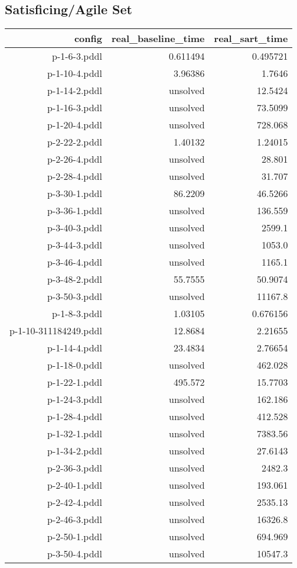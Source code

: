 \documentclass{article}
\begin{document}
                    \subsection*{Satisficing/Agile Set}
                    
                            \begin{center}
                            \scriptsize
                            \begin{tabular}{r|r|r}
                            config & real\_baseline\_time & real\_sart\_time\\\midrule
                             p-1-6-3.pddl&0.611494&0.495721\\
 p-1-10-4.pddl&3.96386&1.7646\\
 p-1-14-2.pddl&unsolved&12.5424\\
 p-1-16-3.pddl&unsolved&73.5099\\
 p-1-20-4.pddl&unsolved&728.068\\
 p-2-22-2.pddl&1.40132&1.24015\\
 p-2-26-4.pddl&unsolved&28.801\\
 p-2-28-4.pddl&unsolved&31.707\\
 p-3-30-1.pddl&86.2209&46.5266\\
 p-3-36-1.pddl&unsolved&136.559\\
 p-3-40-3.pddl&unsolved&2599.1\\
 p-3-44-3.pddl&unsolved&1053.0\\
 p-3-46-4.pddl&unsolved&1165.1\\
 p-3-48-2.pddl&55.7555&50.9074\\
 p-3-50-3.pddl&unsolved&11167.8\\
 p-1-8-3.pddl&1.03105&0.676156\\
 p-1-10-311184249.pddl&12.8684&2.21655\\
 p-1-14-4.pddl&23.4834&2.76654\\
 p-1-18-0.pddl&unsolved&462.028\\
 p-1-22-1.pddl&495.572&15.7703\\
 p-1-24-3.pddl&unsolved&162.186\\
 p-1-28-4.pddl&unsolved&412.528\\
 p-1-32-1.pddl&unsolved&7383.56\\
 p-1-34-2.pddl&unsolved&27.6143\\
 p-2-36-3.pddl&unsolved&2482.3\\
 p-2-40-1.pddl&unsolved&193.061\\
 p-2-42-4.pddl&unsolved&2535.13\\
 p-2-46-3.pddl&unsolved&16326.8\\
 p-2-50-1.pddl&unsolved&694.969\\
 p-3-50-4.pddl&unsolved&10547.3
                            \end{tabular}
                            \end{center}
                    
\end{document}
